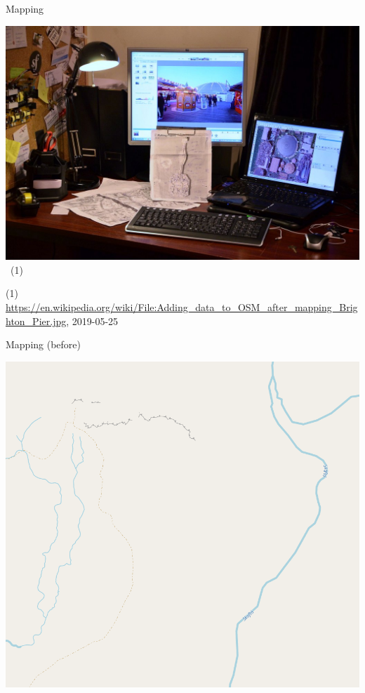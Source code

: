 \documentclass{beamer}
\begin{document}
	\begin{frame}{Mapping}
		\begin{center}
			\includegraphics[width=0.7\linewidth,height=0.7\textheight,keepaspectratio]{images/mapping_outdoor}~\tiny{(1)}
		\end{center}
		{\tiny (1) \url{https://en.wikipedia.org/wiki/File:Adding\_data\_to\_OSM\_after\_mapping\_Brighton\_Pier.jpg}, 2019-05-25}
	\end{frame}

	\begin{frame}{Mapping (before)}
		\begin{center}
			\includegraphics[height=0.9\textheight,keepaspectratio]{images/osm-uxatindar-river-0}
		\end{center}
	\end{frame}
\end{document}
